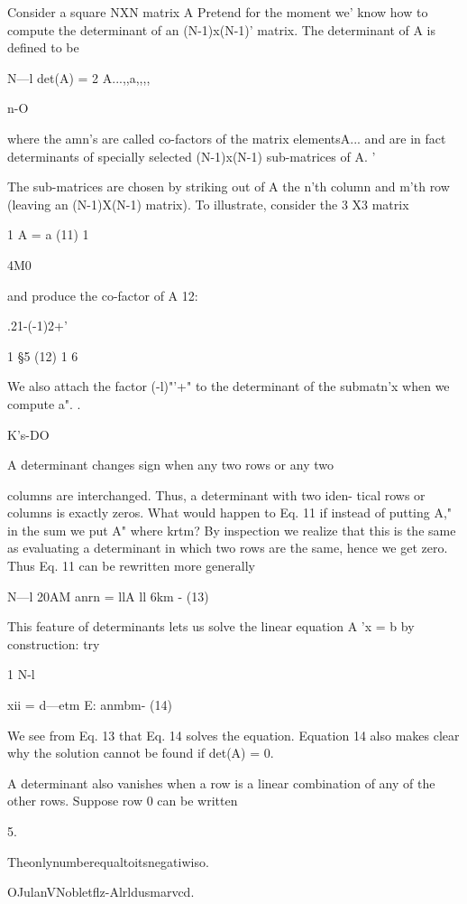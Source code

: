 {Consider a square NXN matrix A Pretend for the moment we'
know how to compute the determinant of an (N-1)x(N-1)'
matrix. The determinant of A is deﬁned to be

N—l
det(A) = 2 A...,,a,,,,

n-O

where the amn's are called co-factors of the matrix elementsA...
and are in fact determinants of specially selected (N-1)x(N-1)
sub-matrices of A. '

The sub-matrices are chosen by striking out of A the n'th column
and m'th row (leaving an (N-1)X(N-1) matrix). To illustrate,
consider the 3 X3 matrix

1
A = a (11)
1

4M0

and produce the co-factor of A 12:

 

.21-(-1)2+'

1 \S 5 (12)
1 6

We also attach the factor (-l)"'+" to the determinant of the
submatn'x when we compute a". .

K's-DO

A determinant changes sign when any two rows or any two

columns are interchanged. Thus, a determinant with two iden-
tical rows or columns is exactly zeros. What would happen to
Eq. 11 if instead of putting A," in the sum we put A" where
krtm? By inspection we realize that this is the same as evaluating
a determinant in which two rows are the same, hence we get zero.
Thus Eq. 11 can be rewritten more generally

N—l
20AM anrn = llA ll 6km - (13)

This feature of determinants lets us solve the linear equation
A 'x = b by construction: try

1 N-l

xii = d—etm E: anmbm- (14)

We see from Eq. 13 that Eq. 14 solves the equation. Equation 14
also makes clear why the solution cannot be found if det(A) = 0.

A determinant also vanishes when a row is a linear combination
of any of the other rows. Suppose row 0 can be written

 

5.

Theonlynumberequaltoitsnegatiwiso.

OJulanVNobletflz-Alrldusmarvcd.

}
